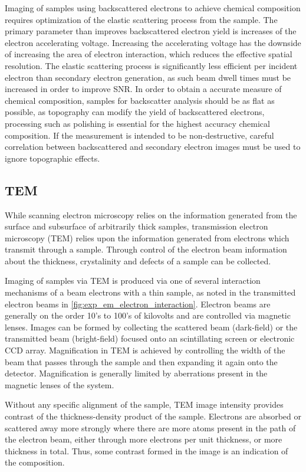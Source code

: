 Imaging of samples using backscattered electrons to achieve chemical composition requires optimization of the elastic scattering process from the sample.
The primary parameter than improves backscattered electron yield is increases of the electron accelerating voltage.
Increasing the accelerating voltage has the downside of increasing the area of electron interaction, which reduces the effective spatial resolution\cite{goldstein2003scanning}.
The elastic scattering process is significantly less efficient per incident electron than secondary electron generation, as such beam dwell times must be increased in order to improve SNR.
In order to obtain a accurate measure of chemical composition, samples for backscatter analysis should be as flat as possible, as topography can modify the yield of backscattered electrons, processing such as polishing is essential for the highest accuracy chemical composition.
If the measurement is intended to be non-destructive, careful correlation between backscattered and secondary electron images must be used to ignore topographic effects.
\subsection{TEM} While scanning electron microscopy relies on the information generated from the surface and subsurface of arbitrarily thick samples, transmission electron microscopy (TEM) relies upon the information generated from electrons which transmit through a sample.
Through control of the electron beam information about the thickness, crystalinity and defects of a sample can be collected.

Imaging of samples via TEM is produced via one of several interaction mechanisms of a beam electrons with a thin sample, as noted in the transmitted electron beams in \cref{fig:exp_em_electron_interaction}.
Electron beams are generally on the order 10's to 100's of kilovolts and are controlled via magnetic lenses\cite{Egerton2005}.
Images can be formed by collecting the scattered beam (dark-field) or the transmitted beam (bright-field) focused onto an scintillating screen or electronic CCD array.
Magnification in TEM is achieved by controlling the width of the beam that passes through the sample and then expanding it again onto the detector.
Magnification is generally limited by aberrations present in the magnetic lenses of the system.

Without any specific alignment of the sample, TEM image intensity provides contrast of the thickness-density product of the sample\cite{Egerton2005}.
Electrons are absorbed or scattered away more strongly where there are more atoms present in the path of the electron beam, either through more electrons per unit thickness, or more thickness in total.
Thus, some contrast formed in the image is an indication of the composition.

